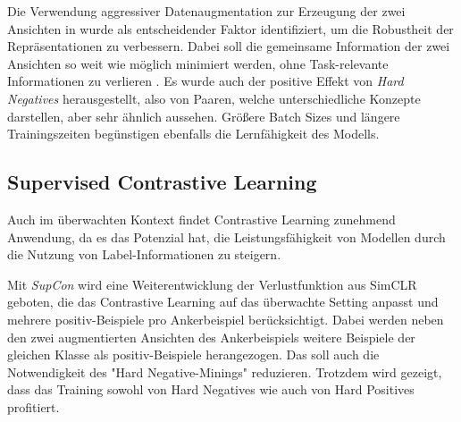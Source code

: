 Die Verwendung aggressiver Datenaugmentation zur Erzeugung der zwei Ansichten in \parencite{Chen2020simclr} wurde als entscheidender Faktor identifiziert, um die Robustheit der Repräsentationen zu verbessern. Dabei soll die gemeinsame Information der zwei Ansichten so weit wie möglich minimiert werden, ohne Task-relevante Informationen zu verlieren \parencite{Tian2020goodcontrastiveviews}. Es wurde auch der positive Effekt von \emph{Hard Negatives} herausgestellt, also von Paaren, welche unterschiedliche Konzepte darstellen, aber sehr ähnlich aussehen. Größere Batch Sizes und längere Trainingszeiten begünstigen ebenfalls die Lernfähigkeit des Modells.


\subsection{Supervised Contrastive Learning} \label{subsec:sup-contrastive}

Auch im überwachten Kontext findet Contrastive Learning zunehmend Anwendung, da es das Potenzial hat, die Leistungsfähigkeit von Modellen durch die Nutzung von Label-Informationen zu steigern.

Mit \emph{SupCon} \parencite{Khosla2021supcon} wird eine Weiterentwicklung der Verlustfunktion aus SimCLR geboten, die das Contrastive Learning auf das überwachte Setting anpasst und mehrere positiv-Beispiele pro Ankerbeispiel berücksichtigt. Dabei werden neben den zwei augmentierten Ansichten des Ankerbeispiels weitere Beispiele der gleichen Klasse als positiv-Beispiele herangezogen. Das soll auch die Notwendigkeit des "Hard Negative-Minings" reduzieren. Trotzdem wird gezeigt, dass das Training sowohl von Hard Negatives wie auch von Hard Positives profitiert.

